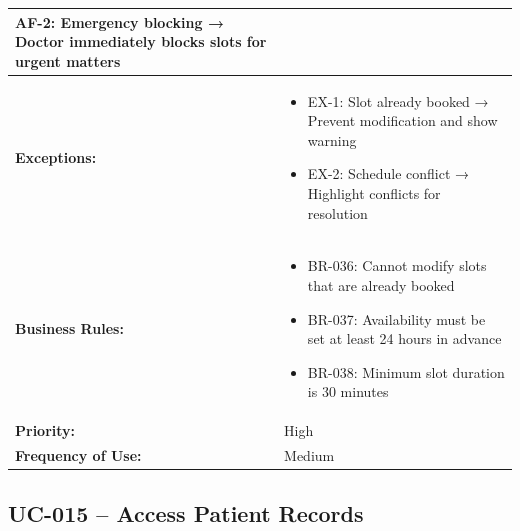 \documentclass[12pt,a4paper]{article}
\begin{document}
\begin{longtable}{|p{4.5cm}|p{10.5cm}|}
\textbf{AF-2:} Emergency blocking → Doctor immediately blocks slots for urgent matters \\
\hline
\textbf{Exceptions:} &
\begin{itemize}
  \item EX-1: Slot already booked → Prevent modification and show warning
  \item EX-2: Schedule conflict → Highlight conflicts for resolution
\end{itemize} \\
\hline
\textbf{Business Rules:} &
\begin{itemize}
  \item BR-036: Cannot modify slots that are already booked
  \item BR-037: Availability must be set at least 24 hours in advance
  \item BR-038: Minimum slot duration is 30 minutes
\end{itemize} \\
\hline
\textbf{Priority:} & High \\
\hline
\textbf{Frequency of Use:} & Medium \\
\hline
\end{longtable}

\subsection{UC-015 – Access Patient Records}
\end{document}
